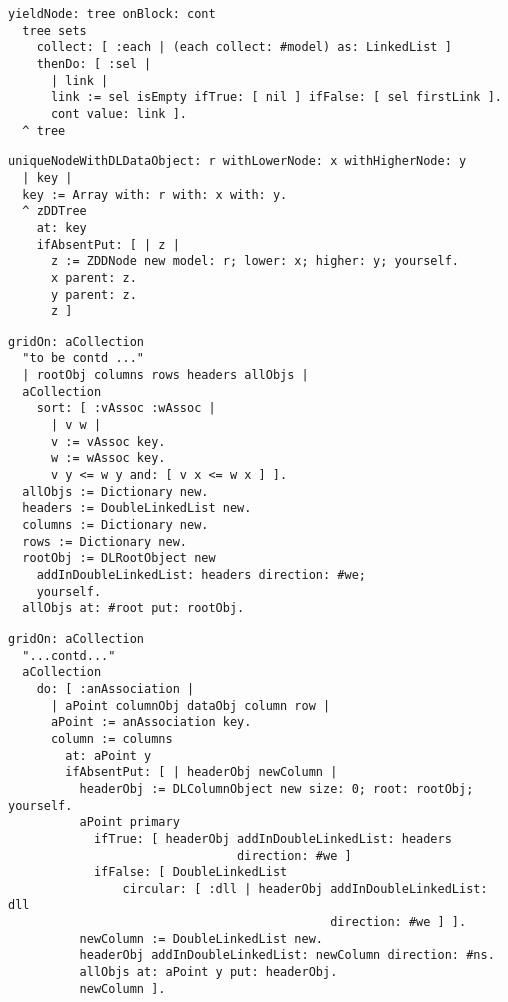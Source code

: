 \documentclass{beamer}
\begin{document}
\begin{frame}[fragile]
\begin{verbatim}
yieldNode: tree onBlock: cont
  tree sets
    collect: [ :each | (each collect: #model) as: LinkedList ]
    thenDo: [ :sel | 
      | link |
      link := sel isEmpty ifTrue: [ nil ] ifFalse: [ sel firstLink ].
      cont value: link ].
  ^ tree
\end{verbatim}
\vfill
\begin{verbatim}
uniqueNodeWithDLDataObject: r withLowerNode: x withHigherNode: y
  | key |
  key := Array with: r with: x with: y.
  ^ zDDTree
    at: key
    ifAbsentPut: [ | z |
      z := ZDDNode new model: r; lower: x; higher: y; yourself.
      x parent: z.
      y parent: z.
      z ]
\end{verbatim}
\end{frame}

\begin{frame}[fragile]
\begin{verbatim}
gridOn: aCollection
  "to be contd ..."
  | rootObj columns rows headers allObjs |
  aCollection
    sort: [ :vAssoc :wAssoc | 
      | v w |
      v := vAssoc key.
      w := wAssoc key.
      v y <= w y and: [ v x <= w x ] ].
  allObjs := Dictionary new.
  headers := DoubleLinkedList new.
  columns := Dictionary new.
  rows := Dictionary new.
  rootObj := DLRootObject new
    addInDoubleLinkedList: headers direction: #we;
    yourself.
  allObjs at: #root put: rootObj.
\end{verbatim}
\end{frame}

\begin{frame}[fragile]
\begin{verbatim}
gridOn: aCollection
  "...contd..."
  aCollection
    do: [ :anAssociation | 
      | aPoint columnObj dataObj column row |
      aPoint := anAssociation key.
      column := columns
        at: aPoint y
        ifAbsentPut: [ | headerObj newColumn |
          headerObj := DLColumnObject new size: 0; root: rootObj; yourself.
          aPoint primary
            ifTrue: [ headerObj addInDoubleLinkedList: headers 
                                direction: #we ]
            ifFalse: [ DoubleLinkedList
                circular: [ :dll | headerObj addInDoubleLinkedList: dll 
                                             direction: #we ] ].
          newColumn := DoubleLinkedList new.
          headerObj addInDoubleLinkedList: newColumn direction: #ns.
          allObjs at: aPoint y put: headerObj.
          newColumn ].
\end{verbatim}
\end{frame}
\end{document}
